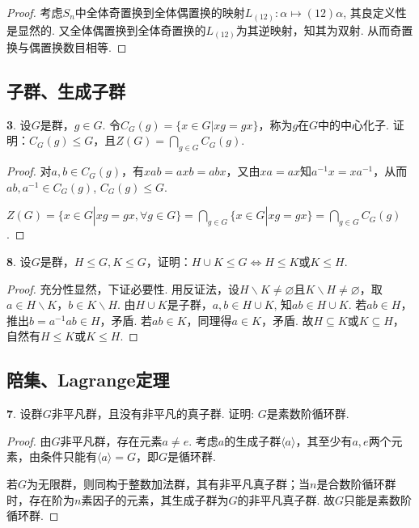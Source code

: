 \begin{proof}
考虑$S_n$中全体奇置换到全体偶置换的映射$L_{(12)}:\alpha\mapsto(12)\alpha$, 其良定义性是显然的. 又全体偶置换到全体奇置换的$L_{(12)}$为其逆映射，知其为双射. 从而奇置换与偶置换数目相等.
\end{proof}

\subsection{子群、生成子群}

\par \textbf{3}.
设$G$是群，$g\in G$. 令$C_G(g)=\{x\in G| xg=gx\}$，称为$g$在$G$中的中心化子. 证明：$C_G(g)\le G$，且$Z(G)=\bigcap_{g\in G}C_G(g)$.

\begin{proof}
对$a,b\in C_G(g)$，有$xab=axb=abx$，又由$xa=ax$知$a^{-1}x=xa^{-1}$，从而$ab,a^{-1}\in C_G(g)$, $C_G(g)\le G$. 
\par $Z(G)=\{x\in G| xg=gx, \forall g\in G\}=\bigcap_{g\in G} \{x\in G| xg=gx\}=\bigcap_{g\in G}C_G(g)$.
\end{proof}

\par \textbf{8}.
设$G$是群，$H\le G,K\le G$，证明：$H\cup K \le G\Leftrightarrow H\le K$或$K\le H$.

\begin{proof}
充分性显然，下证必要性. 用反证法，设$H\backslash K \neq \varnothing$且$K\backslash H \neq \varnothing$，取$a\in H\backslash K$，$b\in K\backslash H$. 由$H\cup K$是子群，$a,b\in H\cup K$, 知$ab \in H\cup K$. 若$ab \in H$，推出$b=a^{-1}ab\in H$，矛盾. 若$ab \in K$，同理得$a\in K$，矛盾. 故$H \subseteq K$或$K \subseteq H$，自然有$H\le K$或$K\le H$.
\end{proof}

\subsection{陪集、Lagrange定理}
\par \textbf{7}. 设群$G$非平凡群，且没有非平凡的真子群. 证明: $G$是素数阶循环群.

\begin{proof}
由$G$非平凡群，存在元素$a\neq e$. 考虑$a$的生成子群$\langle a\rangle$，其至少有$a,e$两个元素，由条件只能有$\langle a\rangle=G$，即$G$是循环群. 
\par 若$G$为无限群，则同构于整数加法群，其有非平凡真子群；当$n$是合数阶循环群时，存在阶为$n$素因子的元素，其生成子群为$G$的非平凡真子群. 故$G$只能是素数阶循环群.
\end{proof}

